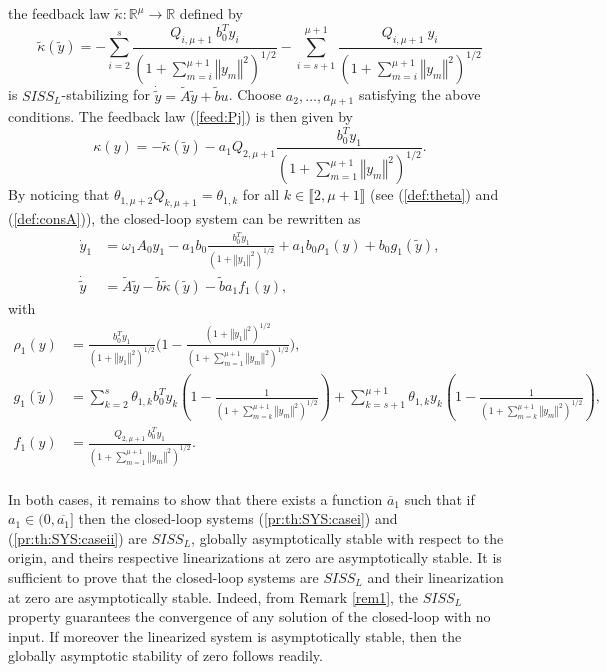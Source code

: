 \documentclass[letterpaper, 10pt]{article}
\newcommand{\rref}[1]{(\ref{#1})}
\newcommand{\norme}[1]{\left\Vert #1\right\Vert}
\newcommand{\reels}{\mathbb{R}}
\begin{document}
the feedback law $\tilde{\kappa}:\reels^\mu\rightarrow \reels$ defined by
\begin{equation}
\label{feed_int}
\tilde{\kappa}(\tilde{y}) =  - \sum\limits_{i=2}^{s} \frac{Q_{i,\mu+1} \:  b_0^T y_i}{  (1 + \sum\limits_{m=i}^{\mu+1} \norme{y_m}^2 )^{1/2}}  - \sum\limits_{i=s+1}^{\mu+1}   \frac{Q_{i,\mu+1} \:   y_i}{( 1 + \sum\limits_{m=i}^{\mu+1} \norme{y_m}^2 )^{1/2}}
\end{equation} is $SISS_L$-stabilizing for $\dot{\tilde{y}}  = \tilde{A} \tilde{y} + \tilde{b} u$. Choose $a_2 , \ldots , a_{\mu+1}$ satisfying the above conditions. The feedback law \rref{feed:Pj} is then given by
\begin{equation*}
\kappa(y) = - \tilde{\kappa} (\tilde{y}) - a_1 Q_{2,\mu+1} \frac{b_0^T y_1}{(1 + \sum\limits_{m=1}^{\mu +1} \norme{y_m}^2 )^{1/2}}  .
\end{equation*} By noticing that $\theta_{1,\mu+2} Q_{k,\mu+1}= \theta_{1,k}$ for all $k \in \llbracket 2, \mu+1 \rrbracket$  (see \rref{def:theta} and \rref{def:consA}), the closed-loop system can be rewritten as
\begin{align}
\label{pr:th:SYS:caseii}
 \dot{y}_1 & = \omega_1 A_0 y_1  -  a_1 b_0 \frac{b_0^T y_1}{(1 + \norme{y_1}^2 )^{1/2}} + a_1 b_0 \rho_1(y) + b_0 g_1(\tilde{y}) , \nonumber \\
  \dot{\tilde{y}} & = \tilde{A} \tilde{y}  - \tilde{b}  \tilde{\kappa} (\tilde{y})  - \tilde{b}  a_1 f_1(y),
\end{align} with 
\begin{align}
\label{ro_1:est}
\rho_1(y) &= \frac{b_0^T y_1}{(1 + \norme{y_1}^2 )^{1/2}} \big(  1 - \frac{(1 + \norme{y_1}^2 )^{1/2}}{(1 + \sum\limits_{m=1}^{\mu+1} \norme{y_m}^2 )^{1/2}} \big) , \\ \label{g_1:est}
g_1(\tilde{y})& = \sum_{k=2}^{s} \theta_{1,k} b_0^T y_k ( 1 - \frac{1 }{(1 + \sum\limits_{m=k}^{\mu+1} \norme{y_m}^2 )^{1/2}} ) + \sum_{k=s+1}^{\mu+1} \theta_{1,k} y_k ( 1 - \frac{1 }{  (1 + \sum\limits_{m=k}^{\mu+1} \norme{y_m}^2 )^{1/2}} ), \\
\label{f_1:est}
f_1(y) & =   \frac{ Q_{2,\mu+1} \: b_0^T y_1}{ (1 + \sum\limits_{m=1}^{\mu+1} \norme{y_m}^2 )^{1/2}} .
\end{align}

\paragraph{}
In both cases, it remains to show that there exists a function $\overline{a}_1$ such that if $a_1 \in (0, \overline{a_1}]$ then the closed-loop systems \rref{pr:th:SYS:casei} and \rref{pr:th:SYS:caseii}  are $SISS_L$, globally asymptotically stable with respect to the origin, and theirs respective linearizations at zero are asymptotically stable. It is sufficient to prove that the closed-loop systems are $SISS_L$ and their linearization at zero are asymptotically stable. Indeed, from Remark \ref{rem1}, the $SISS_L$ property guarantees the convergence of any solution of the closed-loop with no input. If moreover the linearized system is asymptotically stable, then the globally asymptotic stability of zero follows readily.
\end{document}
